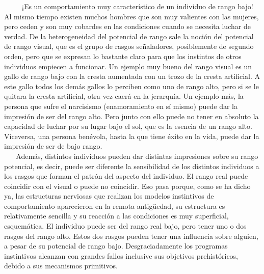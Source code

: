 ~ ~ ~ ¡Es un comportamiento muy característico de un individuo de rango
bajo! Al mismo tiempo existen muchos hombres que son muy valientes con
las mujeres, pero ceden y son muy cobardes en las condiciones cuando se
necesita luchar de verdad. De la heterogeneidad del potencial de rango
sale la noción del potencial de rango visual, que es el grupo de rasgos
señaladores, posiblemente de segundo orden, pero que se expresan lo
bastante claro para que los instintos de otros individuos empiecen a
funcionar. Un ejemplo muy bueno del rango visual es un gallo de rango
bajo con la cresta aumentada con un trozo de la cresta artificial. A
este gallo todos los demás gallos lo perciben como uno de rango alto,
pero si se le quitara la cresta artificial, otra vez caerá en la
jerarquía. Un ejemplo más, la persona que sufre el narcisismo
(enamoramiento en sí mismo) puede dar la impresión de ser del rango
alto. Pero junto con ello puede no tener en absoluto la capacidad de
luchar por su lugar bajo el sol, que es la esencia de un rango alto.
Viceversa, una persona benévola, hasta la que tiene éxito en la vida,
puede dar la impresión de ser de bajo rango.\\
\hspace*{0.333em} ~ ~ Además, distintos individuos pueden dar distintas
impresiones sobre su rango potencial, es decir, puede ser diferente la
sensibilidad de los distintos individuos a los rasgos que forman el
patrón del aspecto del individuo. El rango real puede coincidir con el
visual o puede no coincidir. Eso pasa porque, como se ha dicho ya, las
estructuras nerviosas que realizan los modelos instintivos de
comportamiento aparecieron en la remota antigüedad, su estructura es
relativamente sencilla y su reacción a las condiciones es muy
superficial, esquemática. El individuo puede ser del rango real bajo,
pero tener uno o dos rasgos del rango alto. Estos dos rasgos pueden
tener una influencia sobre alguien, a pesar de su potencial de rango
bajo. Desgraciadamente los programas instintivos alcanzan con grandes
fallos inclusive sus objetivos prehistóricos, debido a sus mecanismos
primitivos.

